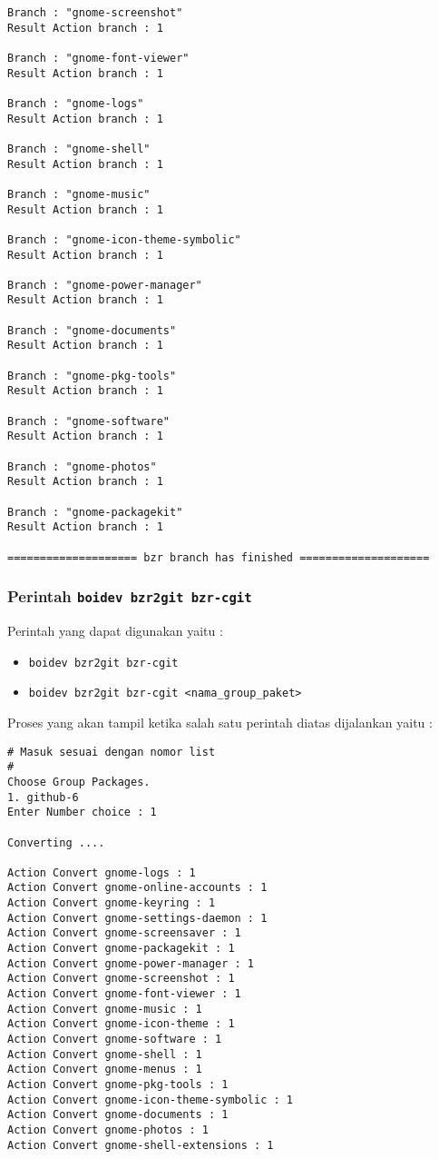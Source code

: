 {\begin{lstlisting}[language=ShellBash2]
Branch : "gnome-screenshot"
Result Action branch : 1

Branch : "gnome-font-viewer"
Result Action branch : 1

Branch : "gnome-logs"
Result Action branch : 1

Branch : "gnome-shell"
Result Action branch : 1

Branch : "gnome-music"
Result Action branch : 1

Branch : "gnome-icon-theme-symbolic"
Result Action branch : 1

Branch : "gnome-power-manager"
Result Action branch : 1

Branch : "gnome-documents"
Result Action branch : 1

Branch : "gnome-pkg-tools"
Result Action branch : 1

Branch : "gnome-software"
Result Action branch : 1

Branch : "gnome-photos"
Result Action branch : 1

Branch : "gnome-packagekit"
Result Action branch : 1

==================== bzr branch has finished ====================

\end{lstlisting}

\subsubsection{Perintah {\small \texttt{boidev bzr2git bzr-cgit}}}
\noindent
Perintah yang dapat digunakan yaitu :
\begin{itemize}
	\item {\small \texttt{boidev bzr2git bzr-cgit}}
	\item {\small \texttt{boidev bzr2git bzr-cgit <nama\_group\_paket>}}
\end{itemize}

\noindent
Proses yang akan tampil ketika salah satu perintah diatas dijalankan yaitu :

\begin{lstlisting}[language=ShellBash2]
# Masuk sesuai dengan nomor list
#
Choose Group Packages.
1. github-6
Enter Number choice : 1

Converting .... 

Action Convert gnome-logs : 1
Action Convert gnome-online-accounts : 1
Action Convert gnome-keyring : 1
Action Convert gnome-settings-daemon : 1
Action Convert gnome-screensaver : 1
Action Convert gnome-packagekit : 1
Action Convert gnome-power-manager : 1
Action Convert gnome-screenshot : 1
Action Convert gnome-font-viewer : 1
Action Convert gnome-music : 1
Action Convert gnome-icon-theme : 1
Action Convert gnome-software : 1
Action Convert gnome-shell : 1
Action Convert gnome-menus : 1
Action Convert gnome-pkg-tools : 1
Action Convert gnome-icon-theme-symbolic : 1
Action Convert gnome-documents : 1
Action Convert gnome-photos : 1
Action Convert gnome-shell-extensions : 1


\end{lstlisting}}
